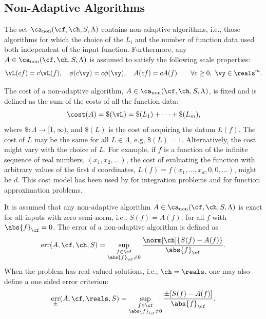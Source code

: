 \documentclass[]{elsarticle}
\DeclareMathOperator{\fix}{non}
\DeclareMathOperator{\err}{err}
\theoremstyle{definition}
\theoremstyle{remark}
\newcommand{\Fnorm}[1]{\abs{#1}_{\cf}}
\begin{document}
\subsection{Non-Adaptive Algorithms} \label{NonAdaptsec}

The set $\ca_{\fix}(\cf,\ch,S,\Lambda)$ contains non-adaptive algorithms, i.e., those algorithms for which the choice of the $L_i$ and the number of function data used both independent of the input function.  Furthermore, any $A \in \ca_{\fix}(\cf,\ch,S,\Lambda)$ is assumed to satisfy the following scale properties:
\begin{equation}
\label{algoscale}
\vL(cf) = c \vL(f), \quad 
\phi(c\vy) = c\phi(\vy), \quad A(cf) = cA(f) \qquad \forall c \ge 0, \ \vy \in \reals^m.
\end{equation}

The cost of a non-adaptive algorithm, $A \in  \ca_{\fix}(\cf,\ch,S,\Lambda)$, is fixed and is defined as the sum of the costs of all the function data:
\begin{equation} \label{costfix}
\cost(A) = \$(\vL) = \$(L_1) + \cdots +\$(L_m),
\end{equation}
where $\$:\Lambda \to [1,\infty)$, and $\$(L)$ is the cost of acquiring the datum $L(f)$. The cost of $L$ may be the same for all $L \in \Lambda$, e.g, $\$(L)=1$.  Alternatively, the cost might vary with the choice of $L$.  For example, if $f$ is a function of the infinite sequence of real numbers, $(x_1, x_2, \ldots)$, the cost of evaluating the function with arbitrary values of the first $d$ coordinates, $L(f)=f(x_1, \ldots, x_d, 0, 0, \ldots)$, might be $d$.  This cost model has been used by \cite{HicMGRitNiu09a,KuoEtal10a,NiuHic09a,NiuHic09b,PlaWas11a} for integration problems and \cite{Was13a,WasWoz11a,WasWoz11b} for function approximation problems.

It is assumed that any non-adaptive algorithm $A  \in \ca_{\fix}(\cf,\ch,S,\Lambda)$ is exact for all inputs with zero semi-norm, i.e., $S(f)=A(f)$, for all $f$ with $\Fnorm{f}=0$.  The error of a non-adaptive algorithm is defined  as
\begin{equation} \label{errdefworst}
\err(A,\cf,\ch,S)= \sup_{\substack{f \in \cf\\ \Fnorm{f} \ne 0}}  \frac{\norm[\ch]{S(f) -  A(f)}}{\Fnorm{f}}.
\end{equation}
When the problem has real-valued solutions, i.e., $\ch=\reals$, one may also define a one sided error criterion:
\begin{equation}\label{errpmdefworst}
\err_{\pm}(A,\cf,\reals,S) = \sup_{\substack{f \in \cf\\ \Fnorm{f} \ne 0}}  \frac{\pm[S(f) -  A(f)]}{\Fnorm{f}} . 
\end{equation}
\end{document}
